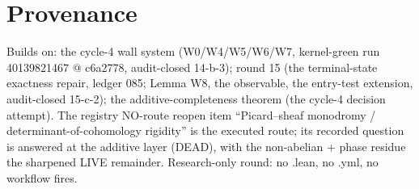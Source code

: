 \documentclass[11pt]{article}
\begin{document}
\section{Provenance}

Builds on: the cycle-4 wall system (W0/W4/W5/W6/W7, kernel-green run
40139821467 @ c6a2778, audit-closed 14-b-3); round 15 (the terminal-state
exactness repair, ledger 085; Lemma W8, the observable, the entry-test
extension, audit-closed 15-c-2); the additive-completeness theorem (the
cycle-4 decision attempt). The registry NO-route reopen item
``Picard--sheaf monodromy / determinant-of-cohomology rigidity'' is the
executed route; its recorded question is answered at the additive layer
(DEAD), with the non-abelian + phase residue the sharpened LIVE remainder.
Research-only round: no .lean, no .yml, no workflow fires.
\end{document}
